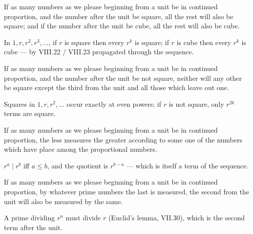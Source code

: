 \begin{claim}
\label{prop:IX.9}
If as many numbers as we please beginning from a unit be in continued
proportion, and the number after the unit be square, all the rest
will also be square; and if the number after the unit be cube, all
the rest will also be cube.
\end{claim}
\begin{evidence}[Proof of IX.9]
\label{ev:IX.9}
In $1, r, r^2, r^3, \dots$, if $r$ is square then every $r^k$ is
square; if $r$ is cube then every $r^k$ is cube --- by VIII.22 /
VIII.23 propagated through the sequence.
\end{evidence}

\begin{claim}
\label{prop:IX.10}
If as many numbers as we please beginning from a unit be in continued
proportion, and the number after the unit be not square, neither will
any other be square except the third from the unit and all those
which leave out one.
\end{claim}
\begin{evidence}[Proof of IX.10]
\label{ev:IX.10}
Squares in $1, r, r^2, \dots$ occur exactly at even powers; if $r$
is not square, only $r^{2k}$ terms are square.
\end{evidence}

\begin{claim}
\label{prop:IX.11}
If as many numbers as we please beginning from a unit be in continued
proportion, the less measures the greater according to some one of
the numbers which have place among the proportional numbers.
\end{claim}
\begin{evidence}[Proof of IX.11]
\label{ev:IX.11}
$r^a \mid r^b$ iff $a \le b$, and the quotient is $r^{b-a}$ --- which
is itself a term of the sequence.
\end{evidence}

\begin{claim}
\label{prop:IX.12}
If as many numbers as we please beginning from a unit be in continued
proportion, by whatever prime numbers the last is measured, the
second from the unit will also be measured by the same.
\end{claim}
\begin{evidence}[Proof of IX.12]
\label{ev:IX.12}
A prime dividing $r^n$ must divide $r$ (Euclid's lemma, VII.30),
which is the second term after the unit.
\end{evidence}

